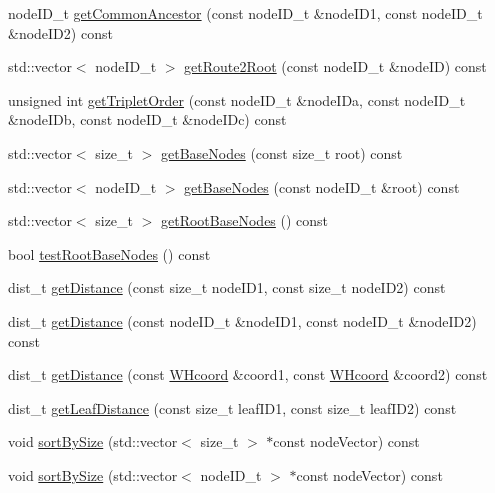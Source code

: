 \begin{DoxyCompactItemize}
\item 
node\-I\-D\-\_\-t \hyperlink{classWHtree_aeb15be3e2c18384d6fb36ce38a64f795}{get\-Common\-Ancestor} (const node\-I\-D\-\_\-t \&node\-I\-D1, const node\-I\-D\-\_\-t \&node\-I\-D2) const 
\item 
std\-::vector$<$ node\-I\-D\-\_\-t $>$ \hyperlink{classWHtree_a089e58eee47582beeabf8a2a2b2a72de}{get\-Route2\-Root} (const node\-I\-D\-\_\-t \&node\-I\-D) const 
\item 
unsigned int \hyperlink{classWHtree_afafbcc4854af05430f68716da6dcf15d}{get\-Triplet\-Order} (const node\-I\-D\-\_\-t \&node\-I\-Da, const node\-I\-D\-\_\-t \&node\-I\-Db, const node\-I\-D\-\_\-t \&node\-I\-Dc) const 
\item 
std\-::vector$<$ size\-\_\-t $>$ \hyperlink{classWHtree_a5d37053a08788138498c80167713f372}{get\-Base\-Nodes} (const size\-\_\-t root) const 
\item 
std\-::vector$<$ node\-I\-D\-\_\-t $>$ \hyperlink{classWHtree_a738b06e4dea9b1bedb4fdb43273599a0}{get\-Base\-Nodes} (const node\-I\-D\-\_\-t \&root) const 
\item 
std\-::vector$<$ size\-\_\-t $>$ \hyperlink{classWHtree_abbdb2132e3114a12c07bcb42af832134}{get\-Root\-Base\-Nodes} () const 
\item 
bool \hyperlink{classWHtree_a2ce2301182542eb6cafd8b212a15be66}{test\-Root\-Base\-Nodes} () const 
\item 
dist\-\_\-t \hyperlink{classWHtree_ac9ac003a5bb8734f79c4b0a285a40344}{get\-Distance} (const size\-\_\-t node\-I\-D1, const size\-\_\-t node\-I\-D2) const 
\item 
dist\-\_\-t \hyperlink{classWHtree_a8a08e4cfbbeaa3a54930693bf04f310f}{get\-Distance} (const node\-I\-D\-\_\-t \&node\-I\-D1, const node\-I\-D\-\_\-t \&node\-I\-D2) const 
\item 
dist\-\_\-t \hyperlink{classWHtree_aa20e44655a0cadd64746d8019fea16af}{get\-Distance} (const \hyperlink{classWHcoord}{\-W\-Hcoord} \&coord1, const \hyperlink{classWHcoord}{\-W\-Hcoord} \&coord2) const 
\item 
dist\-\_\-t \hyperlink{classWHtree_a16ff893f6799ed8837c0a11bde4b8978}{get\-Leaf\-Distance} (const size\-\_\-t leaf\-I\-D1, const size\-\_\-t leaf\-I\-D2) const 
\item 
void \hyperlink{classWHtree_ab35a13b352c7c37f3269f86d09afa02b}{sort\-By\-Size} (std\-::vector$<$ size\-\_\-t $>$ $\ast$const node\-Vector) const 
\item 
void \hyperlink{classWHtree_ac335b37b8a0a26b9374e76535ac01c94}{sort\-By\-Size} (std\-::vector$<$ node\-I\-D\-\_\-t $>$ $\ast$const node\-Vector) const 

\end{DoxyCompactItemize}
